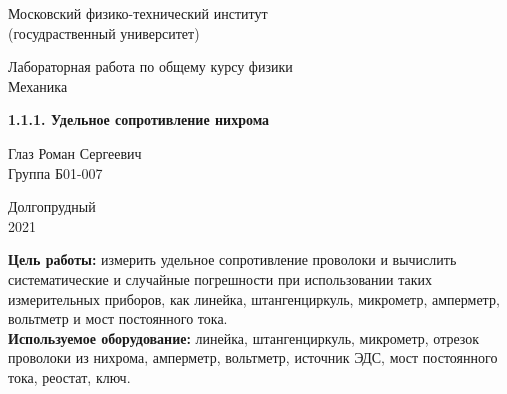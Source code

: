 \documentclass[a4paper, 12pt]{article} %
\begin{document}


\begin{titlepage}

	\newpage
	\begin{center}
		\normalsize Московский физико-технический институт \\(госудраственный университет)
	\end{center}

	\vspace{6em}

	\begin{center}
		\Large Лабораторная работа по общему курсу физики\\Механика
	\end{center}

	\vspace{1em}

	\begin{center}
		\Large \textbf{1.1.1. Удельное сопротивление нихрома}
	\end{center}

	\vspace{2em}

	\begin{center}
		\large Глаз Роман Сергеевич \\
		Группа Б01-007
	\end{center}

	\vspace{\fill}

	\begin{center}
	Долгопрудный \\2021
	\end{center}
	
\end{titlepage}



	\thispagestyle{empty}
	\newpage
	\tableofcontents
	\newpage
	\setcounter{page}{1}


\textbf{Цель работы:} измерить удельное сопротивление проволоки и вычислить систематические и случайные погрешности при использовании таких измерительных приборов, как линейка, штангенциркуль, микрометр, амперметр, вольтметр и мост постоянного тока.\\

\textbf{Используемое оборудование:} линейка, штангенциркуль, микрометр, отрезок проволоки из нихрома, амперметр, вольтметр, источник ЭДС, мост постоянного тока, реостат, ключ.\\
\end{document}
